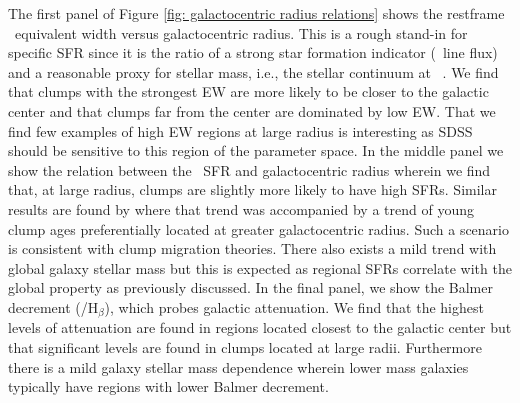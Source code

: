  The first panel of Figure \ref{fig: galactocentric radius relations} shows the restframe \ha~equivalent width versus galactocentric radius. This is a rough stand-in for specific SFR since it is the ratio of a strong star formation indicator (\ha~line flux) and a reasonable proxy for stellar mass, i.e., the stellar continuum at \ha~\citep{MarmolQueralto2016}. We find that clumps with the strongest EW are more likely to be closer to the galactic center and that clumps far from the center are dominated by low EW. That we find few examples of high EW regions at large radius is interesting as SDSS should be sensitive to this region of the parameter space. In the middle panel we show the relation between the \ha~SFR and galactocentric radius wherein we find that, at large radius, clumps are slightly more likely to have high SFRs. Similar results are found by  \cite{Soto2017} where that trend was accompanied by a trend of young clump ages preferentially located at greater galactocentric radius. Such a scenario is consistent with clump migration theories. There also exists a mild trend with global galaxy stellar mass but this is expected as regional SFRs correlate with the global property as previously discussed. In the final panel, we show the Balmer decrement (\ha/H$_{\beta}$), which probes galactic attenuation.  We find that the highest levels of attenuation are found in regions located closest to the galactic center but that significant levels are found in clumps located at large radii.  Furthermore there is a mild galaxy stellar mass dependence wherein lower mass galaxies typically have regions with lower Balmer decrement. 



